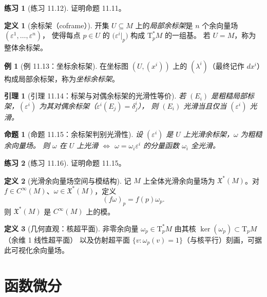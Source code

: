 \documentclass[12pt,a4paper]{article}
\theoremstyle{definition}
\newtheorem{definition}{定义}[section]
\newtheorem{example}{例}[section]
\newtheorem{exercise}{练习}[section]
\theoremstyle{plain}
\newtheorem{proposition}{命题}[section]
\newtheorem{lemma}{引理}[section]
\newcommand{\X}{\mathfrak{X}}
\newcommand{\Cinf}{C^{\infty}}
\newcommand{\Tp}[1]{\mathrm{T}_{#1}}
\newcommand{\Tps}[1]{\mathrm{T}^{*}_{#1}}
\begin{document}
\begin{exercise}[练习 11.12]
证明命题 11.11。
\end{exercise}

\begin{definition}[余标架（coframe）]
开集 $U\subseteq M$ 上的\emph{局部余标架}是 $n$ 个余向量场 $(\varepsilon^1,\dots,\varepsilon^n)$，
使得每点 $p\in U$ 的 $\big(\varepsilon^i|_p\big)$ 构成 $\Tps{p}M$ 的一组基。
若 $U=M$，称为整体余标架。
\end{definition}

\begin{example}[例 11.13：坐标余标架]
在坐标图 $(U,(x^i))$ 上的 $(\lambda^i)$（最终记作 $dx^i$）构成局部余标架，称为\emph{坐标余标架}。
\end{example}

\begin{lemma}[引理 11.14：标架与对偶余标架的光滑性等价]
若 $(E_i)$ 是粗糙局部标架，$(\varepsilon^i)$ 为其对偶余标架（$\varepsilon^i(E_j)=\delta^i_j$），
则 $(E_i)$ 光滑当且仅当 $(\varepsilon^i)$ 光滑。
\end{lemma}

\begin{proposition}[命题 11.15：余标架判别光滑性]
设 $(\varepsilon^i)$ 是 $U$ 上光滑余标架，$\omega$ 为粗糙余向量场。
则 $\omega$ 在 $U$ 上光滑 $\Leftrightarrow$ $\omega=\omega_i\varepsilon^i$ 的分量函数 $\omega_i$ 全光滑。
\end{proposition}

\begin{exercise}[练习 11.16]
证明命题 11.15。
\end{exercise}

\begin{definition}[光滑余向量场空间与模结构]
记 $M$ 上全体光滑余向量场为 $\X^*(M)$。对 $f\in \Cinf(M)$、$\omega\in\X^*(M)$，定义
\[
(f\omega)_p=f(p)\omega_p.
\]
则 $\X^*(M)$ 是 $\Cinf(M)$ 上的模。
\end{definition}

\begin{definition}[几何直观：核超平面]
非零余向量 $\omega_p\in \Tps{p}M$ 由其核 $\ker(\omega_p)\subset \Tp{p}M$（余维 1 线性超平面）
以及仿射超平面 $\{v:\omega_p(v)=1\}$（与核平行）刻画，可据此可视化余向量场。
\end{definition}

\section{函数微分}
\end{document}

